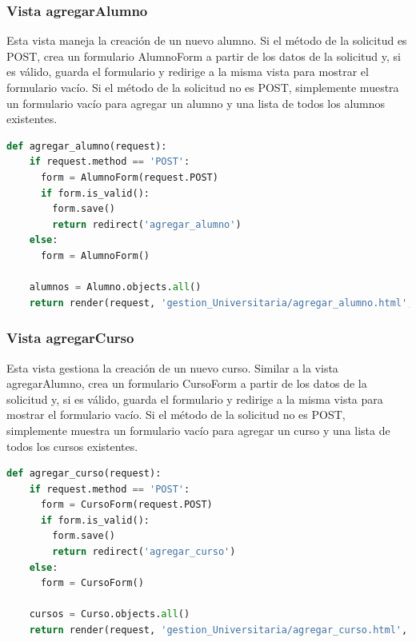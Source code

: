 \documentclass{article}
\begin{document}
  \subsubsection{Vista agregarAlumno}
  Esta vista maneja la creación de un nuevo alumno. Si el método de la solicitud es POST, crea un formulario 
  AlumnoForm a partir de los datos de la solicitud y, si es válido, guarda el formulario y redirige a la misma 
  vista para mostrar el formulario vacío. Si el método de la solicitud no es POST, simplemente muestra un 
  formulario vacío para agregar un alumno y una lista de todos los alumnos existentes.
  \begin{lstlisting}[language=python, caption={Vista agregarAlumno}]
  def agregar_alumno(request):
    if request.method == 'POST':
      form = AlumnoForm(request.POST)
      if form.is_valid():
        form.save()
        return redirect('agregar_alumno')
    else:
      form = AlumnoForm()

    alumnos = Alumno.objects.all()
    return render(request, 'gestion_Universitaria/agregar_alumno.html', {'form': form, 'alumnos': alumnos})
  \end{lstlisting}
  

  \subsubsection{Vista agregarCurso}
  Esta vista gestiona la creación de un nuevo curso. Similar a la vista agregarAlumno, crea un formulario CursoForm 
  a partir de los datos de la solicitud y, si es válido, guarda el formulario y redirige a la misma vista para mostrar 
  el formulario vacío. Si el método de la solicitud no es POST, simplemente muestra un formulario vacío para agregar 
  un curso y una lista de todos los cursos existentes.
  \begin{lstlisting}[language=python, caption={Vista agregarCurso}]
  def agregar_curso(request):
    if request.method == 'POST':
      form = CursoForm(request.POST)
      if form.is_valid():
        form.save()
        return redirect('agregar_curso')
    else:
      form = CursoForm()
      
    cursos = Curso.objects.all()
    return render(request, 'gestion_Universitaria/agregar_curso.html', {'form': form, 'cursos': cursos})
  \end{lstlisting}
  
  
\end{document}
